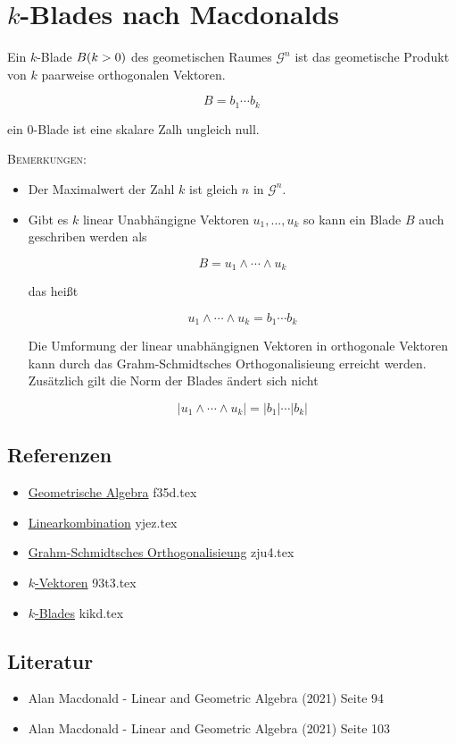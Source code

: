 \documentclass{sajzk}
\begin{document}
\section{\texorpdfstring{\texorpdfstring{$k$-Blades nach Macdonalds}{k-Blades nach Macdonalds}}{k-Blades}}
\label{9o91}
Ein $k$-Blade $B\space(k>0)$ des geometischen Raumes $\mathscr{G}^n$ ist das
geometische Produkt von $k$ paarweise orthogonalen Vektoren.

\[
B=b_1\cdots b_k
\]

ein $0$-Blade ist eine skalare Zalh ungleich null.

\textsc{Bemerkungen:}
\begin{itemize}
    \item Der Maximalwert der Zahl $k$ ist gleich $n$ in $\mathscr{G}^n$.
    \item Gibt es $k$ linear Unabhängigne Vektoren $u_1, ..., u_k$ so kann ein Blade $B$
          auch geschriben werden als

  \[
  B = u_1 \wedge \cdots \wedge u_k
  \]

  das heißt

\[
u_1 \wedge \cdots \wedge u_k = b_1 \cdots b_k
\]

  Die Umformung der linear unabhängignen Vektoren in orthogonale Vektoren kann
  durch das Grahm-Schmidtsches Orthogonalisieung erreicht werden. Zusätzlich
  gilt die Norm der Blades ändert sich nicht
  
\[
  |u_1 \wedge \cdots \wedge u_k| = |b_1| \cdots |b_k|
\]
\end{itemize}
\subsection{Referenzen}
\begin{itemize}
    \item \href{f35d.pdf}{Geometrische Algebra} f35d.tex
    \item \href{yjez.pdf}{Linearkombination} yjez.tex
    \item \href{zju4.pdf}{Grahm-Schmidtsches Orthogonalisieung} zju4.tex
    \item \href{93t3.pdf}{$k$-Vektoren} 93t3.tex
    \item \href{kikd.pdf}{$k$-Blades} kikd.tex
\end{itemize}

\subsection{Literatur}
\begin{itemize}
    \item Alan Macdonald - Linear and Geometric Algebra (2021) Seite 94
    \item Alan Macdonald - Linear and Geometric Algebra (2021) Seite 103
\end{itemize}
\end{document}
